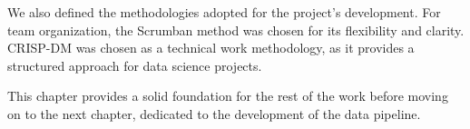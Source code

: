 We also defined the methodologies adopted for the project's development. For team organization, the Scrumban method was chosen for its flexibility and clarity. CRISP-DM was chosen as a technical work methodology, as it provides a structured approach for data science projects.

This chapter provides a solid foundation for the rest of the work before moving on to the next chapter, dedicated to the development of the data pipeline.

